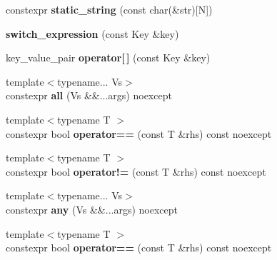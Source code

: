 \begin{CompactItemize}
\item 
\hypertarget{classhope_1_1final_245639ede2861e7b5b6c2805ba197613}{
constexpr \textbf{static\_\-string} (const char(\&str)\mbox{[}N\mbox{]})}
\label{classhope_1_1final_245639ede2861e7b5b6c2805ba197613}

\item 
\hypertarget{classhope_1_1final_b9c30670e6c38678195a944927d2002b}{
\textbf{switch\_\-expression} (const Key \&key)}
\label{classhope_1_1final_b9c30670e6c38678195a944927d2002b}

\item 
\hypertarget{classhope_1_1final_25122ddad9b9e375d02cc9df348d8c7f}{
key\_\-value\_\-pair \textbf{operator\mbox{[}$\,$\mbox{]}} (const Key \&key)}
\label{classhope_1_1final_25122ddad9b9e375d02cc9df348d8c7f}

\item 
\hypertarget{classhope_1_1final_de0143de1670994b815944b87ee610ce}{
{\footnotesize template$<$typename... Vs$>$ }\\constexpr \textbf{all} (Vs \&\&...args) noexcept}
\label{classhope_1_1final_de0143de1670994b815944b87ee610ce}

\item 
\hypertarget{classhope_1_1final_4ec0c84ee90b35265693bcfff1e3dd38}{
{\footnotesize template$<$typename T $>$ }\\constexpr bool \textbf{operator==} (const T \&rhs) const noexcept}
\label{classhope_1_1final_4ec0c84ee90b35265693bcfff1e3dd38}

\item 
\hypertarget{classhope_1_1final_4b5cc4ae2e43b62d9158d81c4f006f04}{
{\footnotesize template$<$typename T $>$ }\\constexpr bool \textbf{operator!=} (const T \&rhs) const noexcept}
\label{classhope_1_1final_4b5cc4ae2e43b62d9158d81c4f006f04}

\item 
\hypertarget{classhope_1_1final_b0bf99768bae97bd34580689228a494a}{
{\footnotesize template$<$typename... Vs$>$ }\\constexpr \textbf{any} (Vs \&\&...args) noexcept}
\label{classhope_1_1final_b0bf99768bae97bd34580689228a494a}

\item 
\hypertarget{classhope_1_1final_4ec0c84ee90b35265693bcfff1e3dd38}{
{\footnotesize template$<$typename T $>$ }\\constexpr bool \textbf{operator==} (const T \&rhs) const noexcept}
\label{classhope_1_1final_4ec0c84ee90b35265693bcfff1e3dd38}


\end{CompactItemize}
